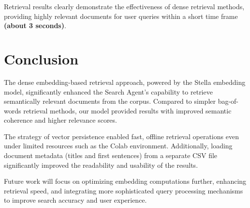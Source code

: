 \documentclass{article}
\begin{document}
Retrieval results clearly demonstrate the effectiveness of dense retrieval methods, providing highly relevant documents for user queries within a short time frame \textbf{(about 3 seconds)}.

\section{Conclusion}

The dense embedding-based retrieval approach, powered by the Stella embedding model, significantly enhanced the Search Agent's capability to retrieve semantically relevant documents from the corpus. Compared to simpler bag-of-words retrieval methods, our model provided results with improved semantic coherence and higher relevance scores.

The strategy of vector persistence enabled fast, offline retrieval operations even under limited resources such as the Colab environment. Additionally, loading document metadata (titles and first sentences) from a separate CSV file significantly improved the readability and usability of the results.

Future work will focus on optimizing embedding computations further, enhancing retrieval speed, and integrating more sophisticated query processing mechanisms to improve search accuracy and user experience.
\end{document}
